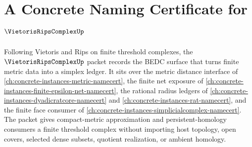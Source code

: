 \chapter{A Concrete Naming Certificate for $\VietorisRipsComplexUp$}
\label{ch:concrete-instances-vietoris-rips-complex-namecert}

Following Vietoris and Rips on finite threshold complexes, the $\VietorisRipsComplexUp$ packet records the BEDC surface that turns finite metric data into a simplex ledger. It sits over the metric distance interface of \autoref{ch:concrete-instances-metric-namecert}, the finite net exposure of \autoref{ch:concrete-instances-finite-epsilon-net-namecert}, the rational radius ledgers of \autoref{ch:concrete-instances-dyadicratcore-namecert} and \autoref{ch:concrete-instances-rat-namecert}, and the finite face consumer of \autoref{ch:concrete-instances-simplicialcomplex-namecert}. The packet gives compact-metric approximation and persistent-homology consumers a finite threshold complex without importing host topology, open covers, selected dense subsets, quotient realization, or ambient homology.

